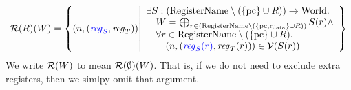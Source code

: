 \documentclass[a4paper]{article}
\begin{document}
\[
  \lrr(R)(W) = \left\{ \npair{\stpair{\reg}{\reg}} \middle|
    \begin{array}{l}
      \exists S : (\RegName \setminus (\{\pcreg \} \cup R))\fun \World \ldotp \\
      \quad W = \bigoplus_{r \in (\RegName\setminus (\{\pcreg,\rdata \} \cup R))} S(r) \wedge \\
      \quad \forall r \in \RegName \setminus (\{\pcreg \} \cup R)\ldotp\\
      \qquad\npair{\stpair[.]{\src{\reg_S(r)}}{\reg_T(r)}} \in \lrv(S(r))
    \end{array}
            \right\}
\]
We write $\mathcal{R}(W)$ to mean $\mathcal{R}(\emptyset)(W)$. That is, if we do not need to exclude extra registers, then we simlpy omit that argument.
\end{document}
